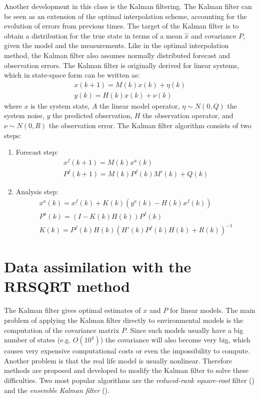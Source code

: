 Another development in this class is the Kalman filtering. The Kalman filter
can be seen as an extension of the optimal interpolation scheme, accounting for
the evolution of errors from previous times. The target of the Kalman filter is
to obtain a distribution for the true state in terms of a mean $\hat{x}$ and
covariance $P$, given the model and the measurements. Like in the optimal
interpolation method, the Kalman filter also assumes normally distributed
forecast and observation errors. The Kalman filter is originally derived for
linear systems, which in state-space form can be written as:
\begin{eqnarray}
x(k+1)= M(k) x(k) + \eta(k) \\
y(k) = H(k) x(k) + \nu(k)
\end{eqnarray}
where $x$ is the system state, $A$ the linear model operator, $\eta \sim
N(0,Q)$ the system noise, $y$ the predicted observation, $H$ the observation
operator, and $\nu \sim N(0,R)$ the observation error. The Kalman filter
algorithm consists of two steps:
\begin{enumerate}
\item Forecast step:
   \begin{eqnarray}
     x^f(k+1) = M(k) x^a(k) \\
     P^f(k+1) = M(k) P^f(k) M'(k) + Q(k)
   \end{eqnarray}
 \item Analysis step:
   \begin{eqnarray}
     x^a(k)=x^f(k) + K(k) (y^o(k) - H(k) x^f(k)) \\
     P^a(k)=(I-K(k) H(k)) P^f(k) \\
     K(k) = P^f(k) H(k) (H'(k) P^f(k) H(k) + R(k))^{-1}
   \end{eqnarray}
\end{enumerate}

\section{Data assimilation  with the RRSQRT method}

The Kalman filter gives optimal estimates of $x$ and $P$ for linear models. The
main problem of applying the Kalman filter directly to environmental models is
the computation of the covariance matrix $P$. Since such models usually have a
big number of states (e.g. $O(10^4)$) the covariance will also become very big,
which causes very expensive computational costs or even the impossibility to
compute. Another problem is that the real life model is usually nonlinear.
Therefore methods are proposed and developed to modify the Kalman filter to
solve these difficulties. Two most popular algorithms are the
\emph{reduced-rank square-root} filter (\cite{VerlaanHeemink1997}) and
the \emph{ensemble Kalman filter} (\cite{Evensen1994}).

